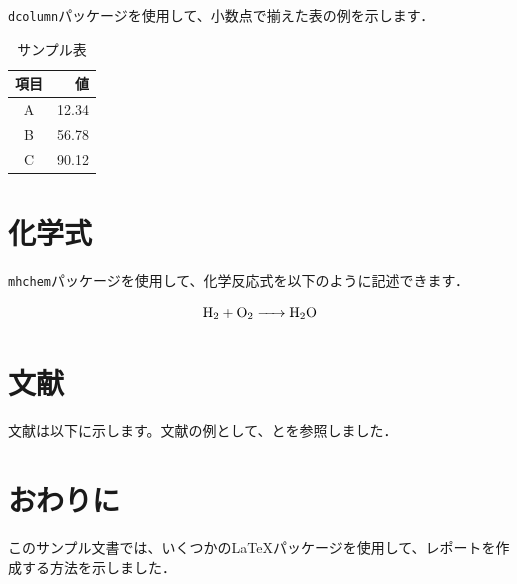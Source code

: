 \documentclass[11pt]{jsarticle}
\begin{document}
\texttt{dcolumn}パッケージを使用して、小数点で揃えた表の例を示します．

\begin{table}[h]
    \centering
    \caption{サンプル表}
    \begin{tabular}{|c|D{.}{.}{2}|}
        \hline
        \textbf{項目} & \textbf{値} \\
        \hline
        A & 12.34 \\
        B & 56.78 \\
        C & 90.12 \\
        \hline
    \end{tabular}
    \label{tab:sample}
\end{table}

\section{化学式} %

\texttt{mhchem}パッケージを使用して、化学反応式を以下のように記述できます．

\begin{equation}
    \ce{H2 + O2 -> H2O}
\end{equation}

\section{文献} %

文献は以下に示します。文献の例として、\cite{sample2024}と\cite{example2024}を参照しました．


\section{おわりに} %

このサンプル文書では、いくつかの{\LaTeX}パッケージを使用して、レポートを作成する方法を示しました．
\end{document}
